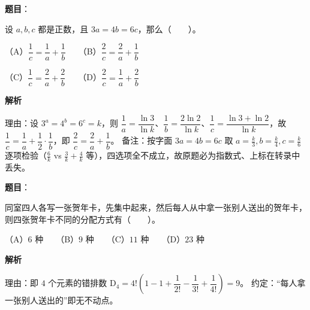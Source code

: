 \begin{answer}

\textbf{题目}：

设 $a,b,c$ 都是正数，且 $3a=4b=6c$，那么\mbox{（　　）}。

（A）$\dfrac1c=\dfrac1a+\dfrac1b$　　（B）$\dfrac2c=\dfrac2a+\dfrac1b$\par\vspace*{3pt}

（C）$\dfrac1c=\dfrac2a+\dfrac2b$　　（D）$\dfrac2c=\dfrac1a+\dfrac2b$

\textbf{解析}

理由：设 $3^a=4^b=6^c=k$，则 $\dfrac1a=\dfrac{\ln3}{\ln k}$、$\dfrac1b=\dfrac{2\ln2}{\ln k}$、$\dfrac1c=\dfrac{\ln3+\ln2}{\ln k}$，故 $\dfrac1c=\dfrac1a+\dfrac12\cdot\dfrac1b$，即 $\dfrac2c=\dfrac2a+\dfrac1b$。
备注：按字面 $3a=4b=6c$ 取 $a=\frac k3,b=\frac k4,c=\frac k6$ 逐项检验（$\frac6k$ vs $\frac3k+\frac4k$ 等），四选项全不成立，故原题必为指数式、上标在转录中丢失。


\end{answer}
\begin{answer}

\textbf{题目}：

同室四人各写一张贺年卡，先集中起来，然后每人从中拿一张别人送出的贺年卡，则四张贺年卡不同的分配方式有\mbox{（　　）}。

（A）$6$ 种　　（B）$9$ 种　　（C）$11$ 种　　（D）$23$ 种

\textbf{解析}

理由：即 $4$ 个元素的错排数 $\mathrm D_4=4!\left(1-1+\dfrac1{2!}-\dfrac1{3!}+\dfrac1{4!}\right)=9$。
约定：“每人拿一张别人送出的”即无不动点。


\end{answer}
